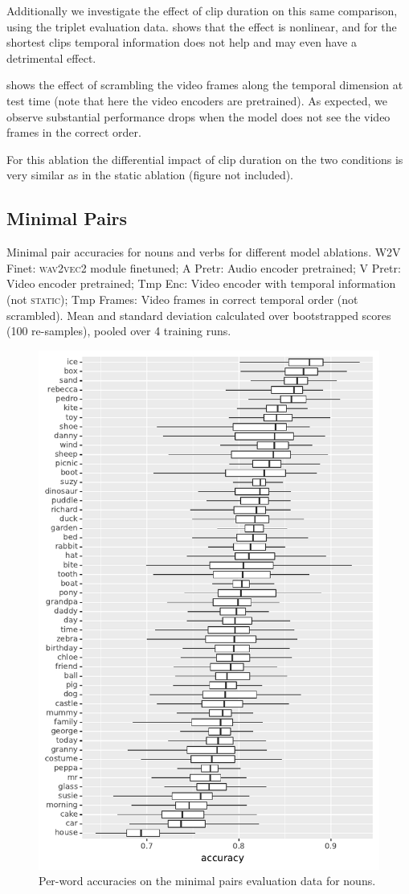 Additionally we investigate the effect of clip duration on this same
comparison, using the triplet evaluation
data.  shows that the effect is nonlinear,
and for the shortest clips temporal information does not
help and may even have a detrimental effect.

 shows the effect of scrambling the video frames 
along the temporal dimension at test time (note that here the video encoders 
are pretrained). As expected, we observe substantial 
performance drops when the model does not see the video frames in 
the correct order. 

For this ablation the differential impact of clip duration on
the two conditions is very similar as in the {\sc static}
ablation (figure not included).

\subsection{Minimal Pairs}
\label{sec:minimal-pairs}
\begin{table}[!htb]
	\centering
	
	\caption{Minimal pair accuracies for nouns and verbs for different model 
		ablations. W2V Finet: \textsc{wav2vec2} module finetuned; A Pretr: 
		Audio encoder pretrained; V Pretr: Video encoder pretrained; Tmp 
		Enc: Video encoder with temporal information (not \textsc{static}); 
		Tmp Frames: Video frames in correct temporal order (not scrambled). 
		Mean and standard 
		deviation calculated over bootstrapped scores (100 re-samples), pooled 
		over 4 training runs.}
	\label{tab:minimal_pair_results}
\end{table}
\begin{figure}[!htb]
  \centering
  \includegraphics[width=.5\textwidth]{results/targeted_triplets/acc_per_word_NOUN.pdf}
  \caption{Per-word accuracies on the minimal pairs evaluation data for nouns.}
  \label{fig:accuracy_targeted_triplets_nouns}
\end{figure}
